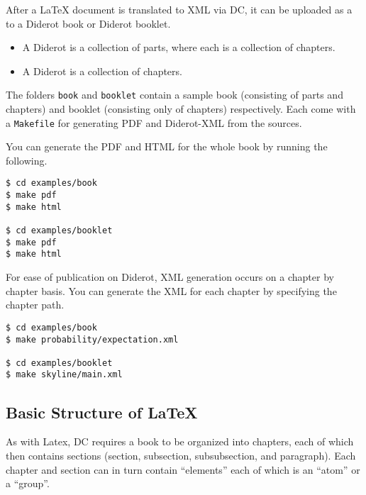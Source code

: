 \begin{definition}
After a LaTeX document is translated to XML via DC, it can be uploaded as a  to a Diderot book or Diderot booklet.  
%

\begin{itemize}
\item
A Diderot  is a collection of parts, where each  is a collection of chapters.

\item
A Diderot  is a collection of chapters. 
\end{itemize}
\end{definition}

\begin{example}
The folders \lstinline`book` and \lstinline`booklet` contain a sample book (consisting of parts and chapters) and booklet (consisting only of chapters) respectively.
%
Each come with a  \lstinline`Makefile` for generating PDF and Diderot-XML from the sources. 
\end{example}

\begin{example}
You can generate the PDF and HTML for the whole book by running the following.
%
\begin{lstlisting}
$ cd examples/book
$ make pdf
$ make html

$ cd examples/booklet
$ make pdf
$ make html
\end{lstlisting}
\end{example}

\begin{example}
For ease of publication on Diderot, XML generation occurs on a chapter by chapter basis.
%
You can generate the XML for  each chapter by specifying the chapter path.
\begin{lstlisting}
$ cd examples/book
$ make probability/expectation.xml

$ cd examples/booklet
$ make skyline/main.xml
\end{lstlisting}
\end{example}


\subsection{Basic Structure of LaTeX} 

As with Latex, DC requires a book to be organized into chapters, each of which then contains sections (section, subsection, subsubsection, and paragraph).  Each chapter and section can in turn contain ``elements'' each of which is an ``atom'' or a  ``group''.


